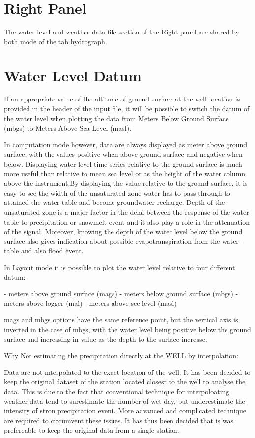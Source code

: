 \documentclass[WHATMANUAL.tex]{subfiles}
\begin{document}
\section{Right Panel}

The water level and weather data file section of the Right panel are shared by both mode of the tab hydrograph. 

\section{Water Level Datum}

If an appropriate value of the altitude of ground surface at the well location is provided in the header of the input file, it will be possible to switch the datum of the water level when plotting the data from Meters Below Ground Surface (mbgs) to Meters Above Sea Level (masl).

In computation mode however, data are always displayed as meter above ground surface, with the values positive when above ground surface and negative when below. Displaying water-level time-series relative to the ground surface is much more useful than relative to mean sea level or as the height of the water column above the instrument.By displaying the value relative to the ground surface, it is easy to see the width of the unsaturated zone water has to pass through to attained the water table and become groundwater recharge. Depth of the unsaturated zone is a major factor in the delai between the response of the water table to precipitation or snowmelt event and it also play a role in the attenuation of the signal. Moreover, knowing the depth of the water level below the ground surface also gives indication about possible evapotranspiration from the water-table and also flood event.

In Layout mode it is possible to plot the water level relative to four different datum:

- meters above ground surface (mags)
- meters below ground surface (mbgs)
- meters above logger (mal)
- meters above see level (masl)

mags and mbgs options have the same reference point, but the vertical axis is inverted in the case of mbgs, with the water level being positive below the ground surface and increasing in value as the depth to the surface increase.

Why Not estimating the precipitation directly at the WELL by interpolation:

Data are not interpolated to the exact location of the well. It has been decided to keep the original dataset of the station located closest to the well to analyse the data. This is due to the fact that conventional technique for interpoloating weather data tend to surestimate the number of wet day, but underestimate the intensity of stron precipitation event. More advanced and complicated technique are required to circumvent these issues. It has thus been decided that is was prefereable to keep the original data from a single station.
\end{document}
